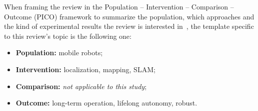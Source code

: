 When framing the review in the Population -- Intervention -- Comparison -- Outcome (PICO) framework to summarize the population, which approaches and the kind of experimental results the review is interested in~\parencite{purpose:pico}, the template specific to this review's topic is the following one:

\begin{itemize}[nosep]
\item \textbf{Population:} mobile robots;
\item \textbf{Intervention:} localization, mapping, SLAM;
\item \textbf{Comparison:} \textit{not applicable to this study};
\item \textbf{Outcome:} long-term operation, lifelong autonomy, robust.
\end{itemize}
